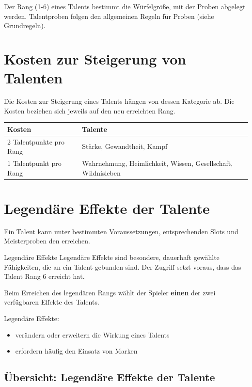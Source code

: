 Der Rang (1-6) eines Talents bestimmt die Würfelgröße, mit der Proben abgelegt werden.
Talentproben folgen den allgemeinen Regeln für Proben
(siehe Grundregeln).

\section{Kosten zur Steigerung von Talenten}

Die Kosten zur Steigerung eines Talents hängen von dessen Kategorie ab.
Die Kosten beziehen sich jeweils auf den neu erreichten Rang.

\begin{center}
	\begin{tabular}{lp{9cm}}
		\toprule
		\textbf{Kosten} & \textbf{Talente} \\
		\midrule
		2 Talentpunkte pro Rang & Stärke, Gewandtheit, Kampf \\
		1 Talentpunkt pro Rang & Wahrnehmung, Heimlichkeit, Wissen, Gesellschaft, Wildnisleben \\
		\bottomrule
	\end{tabular}
\end{center}


\section{Legendäre Effekte der Talente}

Ein Talent kann unter bestimmten Voraussetzungen, entsprechenden Slots und Meisterproben den  erreichen.

\begin{rulebox}{Legendäre Effekte}
	Legendäre Effekte sind besondere, dauerhaft gewählte Fähigkeiten,
	die an ein Talent gebunden sind.
	Der Zugriff setzt voraus, dass das Talent Rang 6 erreicht hat.
\end{rulebox}

Beim Erreichen des legendären Rangs wählt der Spieler
\textbf{einen} der zwei verfügbaren Effekte des Talents.

Legendäre Effekte:
\begin{itemize}
	\item verändern oder erweitern die Wirkung eines Talents
	\item erfordern häufig den Einsatz von Marken
\end{itemize}

\subsection*{Übersicht: Legendäre Effekte der Talente}

